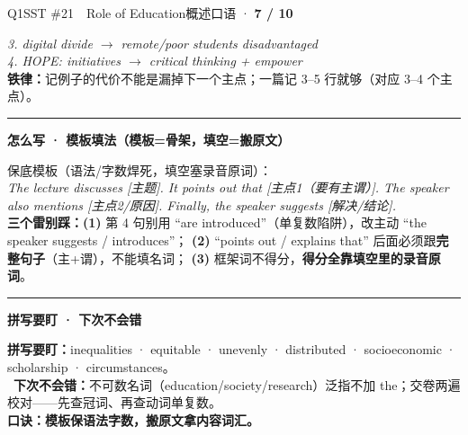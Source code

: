 \documentclass[11pt]{article}
\newcommand{\yes}{{\color{cFix}\ding{51}}}
\newcommand{\ptesub}[1]{%
  \par\needspace{2\baselineskip}\smallskip
  {\color{cAccent}\rule[-0.2ex]{3pt}{1.05em}}\hspace{6pt}%
  {\bfseries\color{cHead}#1}\par\nopagebreak\smallskip}
\begin{document}
\begin{qblock}{Q1\quad SST \#21\ \ Role of Education}{概述口语 · \textcolor{cAccent}{\bfseries 7 / 10}}
\begin{notebox}
\emph{3. digital divide $\to$ remote/poor students disadvantaged}\\
\emph{4. HOPE: initiatives $\to$ critical thinking + empower}\\[2pt]
\textbf{铁律：}记例子的代价不能是漏掉下一个主点；一篇记 3–5 行就够（对应 3–4 个主点）。
\end{notebox}
\ptesub{怎么写 · 模板填法（模板=骨架，填空=搬原文）}
\begin{notebox}\small
保底模板（语法/字数焊死，填空塞录音原词）：\\
\emph{The lecture discusses [主题]. It points out that [主点1（要有主谓）]. The speaker also mentions [主点2/原因]. Finally, the speaker suggests [解决/结论].}\\[2pt]
\textbf{三个雷别踩：}\textbf{(1)} 第 4 句别用 ``are introduced''（单复数陷阱），改主动 ``the speaker suggests / introduces''；
\textbf{(2)} ``points out / explains that'' 后面必须跟\textbf{完整句子}（主+谓），不能填名词；
\textbf{(3)} 框架词不得分，\textbf{得分全靠填空里的录音原词}。
\end{notebox}
\ptesub{拼写要盯 · 下次不会错}
\begin{notebox}\small
\textbf{拼写要盯：}inequalities · equitable · unevenly · distributed · socioeconomic · scholarship · circumstances。\\[2pt]
\yes\ \textbf{下次不会错：}不可数名词（education/society/research）泛指不加 the；交卷两遍校对——先查冠词、再查动词单复数。\\[2pt]
\textbf{口诀：模板保语法字数，搬原文拿内容词汇。}
\end{notebox}
\end{qblock}
\end{document}
